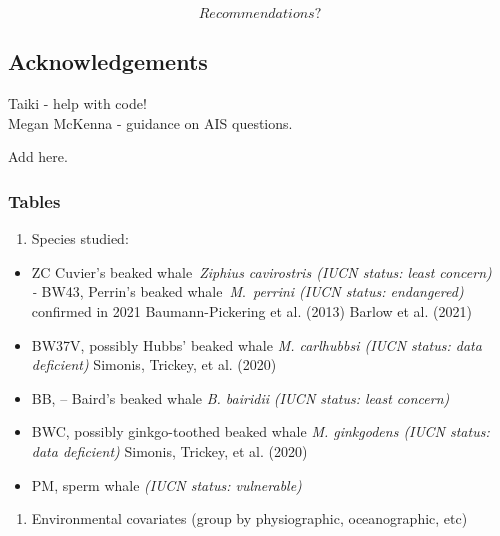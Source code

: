 \documentclass[
]{article}
\providecommand{\tightlist}{%
  \setlength{\itemsep}{0pt}\setlength{\parskip}{0pt}}
\begin{document}
\[Recommendations?\]

\hypertarget{acknowledgements}{%
\subsection{Acknowledgements}\label{acknowledgements}}

Taiki - help with code!\\
Megan McKenna - guidance on AIS questions.

Add here.

\hypertarget{tables}{%
\subsubsection{Tables}\label{tables}}

\begin{enumerate}
\def\labelenumi{\arabic{enumi})}
\tightlist
\item
  Species studied:\\
\end{enumerate}

\begin{itemize}
\tightlist
\item
  ZC Cuvier's beaked whale~\emph{Ziphius cavirostris (IUCN status: least
  concern)\\
  -} BW43, Perrin's beaked whale~\emph{M}.~\emph{perrini (IUCN status:
  endangered)} confirmed in 2021 Baumann-Pickering et al. (2013) Barlow
  et al. (2021)\\
\item
  BW37V, possibly Hubbs' beaked whale \emph{M. carlhubbsi (IUCN status:
  data deficient)} Simonis, Trickey, et al. (2020)\\
\item
  BB, -- Baird's beaked whale \emph{B. bairidii} \emph{(IUCN status:
  least concern)}\\
\item
  BWC, possibly ginkgo-toothed beaked whale \emph{M. ginkgodens (IUCN
  status: data deficient)} Simonis, Trickey, et al. (2020)\\
\item
  PM, sperm whale \emph{(IUCN status: vulnerable)}
\end{itemize}

\begin{enumerate}
\def\labelenumi{\arabic{enumi})}
\setcounter{enumi}{1}
\tightlist
\item
  Environmental covariates (group by physiographic, oceanographic, etc)
\end{enumerate}
\end{document}
